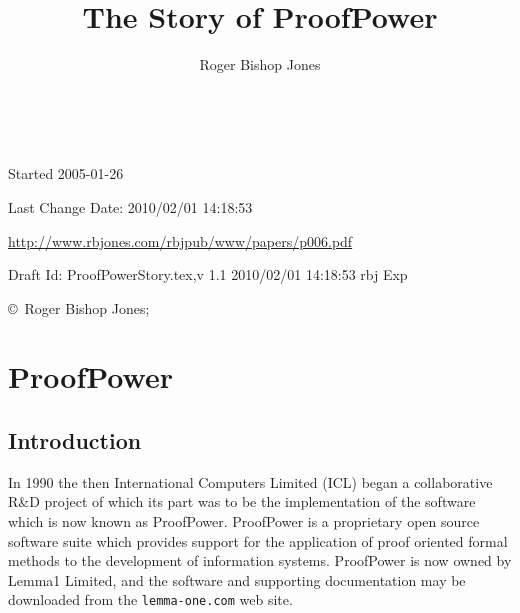 \documentclass[10pt,titlepage]{book}
\title{The Story of ProofPower}
\author{Roger Bishop Jones}
\date{\ }
\def\Product{ProofPower}
\begin{document}
\frontmatter

\begin{titlepage}
\maketitle

\vfill



\vfill

\begin{centering}

\vfill

\footnotesize{
Started 2005-01-26

Last Change $ $Date: 2010/02/01 14:18:53 $ $

\href{http://www.rbjones.com/rbjpub/www/papers/p006.pdf}{http://www.rbjones.com/rbjpub/www/papers/p006.pdf}

Draft $ $Id: ProofPowerStory.tex,v 1.1 2010/02/01 14:18:53 rbj Exp $ $

\copyright\ Roger Bishop Jones;

}%
\end{centering}

\end{titlepage}

{\parskip=0pt\tableofcontents}

\mainmatter

\chapter{ProofPower}


\section{Introduction}

In 1990 the then International Computers Limited (ICL) began a collaborative R\&D project of which its part was to be the implementation of the software which is now known as {\Product}.
{\Product} is a proprietary open source software suite which provides support for the application of proof oriented formal methods to the development of information systems.
{\Product} is now owned by Lemma1 Limited, and the software and supporting documentation may be downloaded from the {\tt lemma-one.com} web site.
\end{document}
